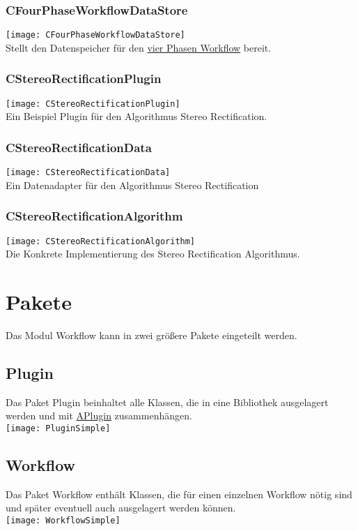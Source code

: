 \subsubsection{CFourPhaseWorkflowDataStore}
\texttt{[image: CFourPhaseWorkflowDataStore]}\\
Stellt den Datenspeicher für den \hyperref[Workflow:CFourPhaseWorkflow]{vier Phasen Workflow} bereit.
\subsubsection{CStereoRectificationPlugin}
\texttt{[image: CStereoRectificationPlugin]}\\
Ein Beispiel Plugin für den Algorithmus Stereo Rectification.
\subsubsection{CStereoRectificationData}
\texttt{[image: CStereoRectificationData]}\\
Ein Datenadapter für den Algorithmus Stereo Rectification
\subsubsection{CStereoRectificationAlgorithm}
\texttt{[image: CStereoRectificationAlgorithm]}\\
Die Konkrete Implementierung des Stereo Rectification Algorithmus.

\section{Pakete}
Das Modul Workflow kann in zwei größere Pakete eingeteilt werden.
\subsection{Plugin}
Das Paket Plugin beinhaltet alle Klassen, die in eine Bibliothek ausgelagert werden und mit \hyperref[Workflow:APlugin]{APlugin} zusammenhängen.
\\\texttt{[image: PluginSimple]}
\subsection{Workflow}
Das Paket Workflow enthält Klassen, die für einen einzelnen Workflow nötig sind und später eventuell auch ausgelagert werden können.
\\\texttt{[image: WorkflowSimple]}
